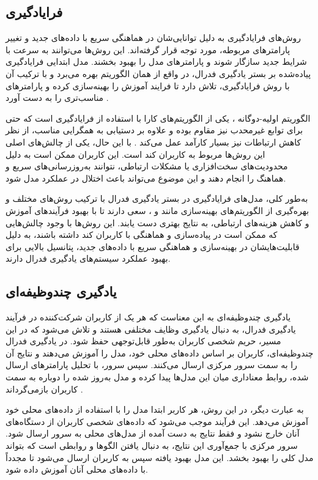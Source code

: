 \subsection{فرایادگیری}
روش‌های فرایادگیری به دلیل توانایی‌شان در هماهنگی سریع با داده‌های جدید و تغییر پارامترهای مربوطه، مورد توجه قرار گرفته‌اند. این روش‌ها می‌توانند به سرعت با شرایط جدید سازگار شوند و پارامترهای مدل را بهبود بخشند.
مدل ابتدایی فرایادگیری پیاده‌شده بر بستر یادگیری فدرال، در واقع از همان الگوریتم
بهره می‌برد و با ترکیب آن با روش فرایادگیری، تلاش دارد تا فرایند آموزش را بهینه‌سازی کرده و پارامترهای مناسب‌تری را به دست آورد
\cite{jiang2019improving}.

الگوریتم اولیه-دوگانه%
%
، یکی از الگوریتم‌های کارا با استفاده از فرایادگیری است که حتی برای توابع غیرمحدب نیز مقاوم بوده و علاوه بر دستیابی به همگرایی مناسب، از نظر کاهش ارتباطات نیز بسیار کارآمد عمل می‌کند
\cite{zhang2021fedpd}.
با این حال، یکی از چالش‌های اصلی این روش‌ها مربوط به کاربران کند است. این کاربران ممکن است به دلیل محدودیت‌های سخت‌افزاری یا مشکلات ارتباطی، نتوانند به‌روزرسانی‌های سریع و هماهنگ را انجام دهند و این موضوع می‌تواند باعث اختلال در عملکرد مدل شود.

به‌طور کلی، مدل‌های فرایادگیری در بستر یادگیری فدرال با ترکیب روش‌های مختلف و بهره‌گیری از الگوریتم‌های بهینه‌سازی مانند
و
%
، سعی دارند تا با بهبود فرآیندهای آموزش و کاهش هزینه‌های ارتباطی، به نتایج بهتری دست یابند. این روش‌ها با وجود چالش‌هایی که ممکن است در پیاده‌سازی و هماهنگی با کاربران کند داشته باشند، به دلیل قابلیت‌هایشان در بهینه‌سازی و هماهنگی سریع با داده‌های جدید، پتانسیل بالایی برای بهبود عملکرد سیستم‌های یادگیری فدرال دارند.

\subsection{یادگیری چندوظیفه‌ای}
یادگیری چندوظیفه‌ای به این معناست که هر یک از کاربران شرکت‌کننده در فرآیند یادگیری فدرال، به دنبال یادگیری وظایف مختلفی هستند و تلاش می‌شود که در این مسیر، حریم شخصی کاربران به‌طور قابل‌توجهی حفظ شود. در یادگیری فدرال چندوظیفه‌ای، کاربران بر اساس داده‌های محلی خود، مدل را آموزش می‌دهند و نتایج آن را به سمت سرور مرکزی ارسال می‌کنند. سپس سرور، با تحلیل پارامترهای ارسال شده، روابط معناداری میان این مدل‌ها پیدا کرده و مدل به‌روز شده را دوباره به سمت کاربران بازمی‌گرداند
\cite{corinzia2019variational}.

به عبارت دیگر، در این روش، هر کاربر ابتدا مدل را با استفاده از داده‌های محلی خود آموزش می‌دهد. این فرآیند موجب می‌شود که داده‌های شخصی کاربران از دستگاه‌های آنان خارج نشود و فقط نتایج به دست آمده از مدل‌های محلی به سرور ارسال شود. سرور مرکزی با جمع‌آوری این نتایج، به دنبال یافتن الگوها و روابطی است که بتواند مدل کلی را بهبود بخشد. این مدل بهبود یافته سپس به کاربران ارسال می‌شود تا مجدداً با داده‌های محلی آنان آموزش داده شود.

